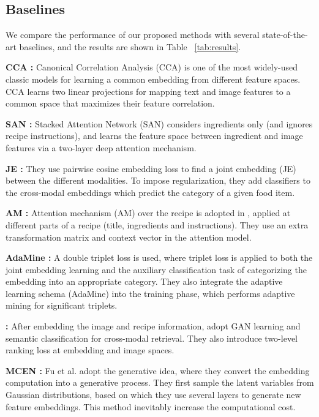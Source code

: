 \documentclass[journal]{IEEEtran}
\begin{document}
\subsection{Baselines}
We compare the performance of our proposed methods with several state-of-the-art baselines, and the results are shown in Table ~\ref{tab:results}.

\textbf{CCA \cite{hotelling1936relations}:} Canonical Correlation Analysis (CCA) is one of the most widely-used classic models for learning a common embedding from different feature spaces. CCA learns two linear projections for mapping text and image features to a common space that maximizes their feature correlation. 

\textbf{SAN \cite{chen2017cross}:} Stacked Attention Network (SAN) considers ingredients only (and ignores recipe instructions), and learns the feature space between ingredient and image features via a two-layer deep attention mechanism.

\textbf{JE \cite{salvador2017learning}:} They use pairwise cosine embedding loss to find a joint embedding (JE) between the different modalities. To impose regularization, they add classifiers to the cross-modal embeddings which predict the category of a given food item.

\textbf{AM \cite{chen2018deep}:} Attention mechanism (AM) over the recipe is adopted in \cite{chen2018deep}, applied at different parts of a recipe (title, ingredients and instructions). They use an extra transformation matrix and context vector in the attention model.

\textbf{AdaMine \cite{carvalho2018cross}:} A double triplet loss is used, where triplet loss is applied to both the joint embedding learning and the auxiliary classification task of categorizing the embedding into an appropriate category. They also integrate the adaptive learning schema (AdaMine) into the training phase, which performs adaptive mining for significant triplets.

\textbf{ \cite{zhu2019r2gan}:} After embedding the image and recipe information,  adopt GAN learning and semantic classification for cross-modal retrieval. They also introduce two-level ranking loss at embedding and image spaces.

\textbf{MCEN \cite{fu2020mcen}:} Fu et al. adopt the generative idea, where they convert the embedding computation into a generative process. They first sample the latent variables from Gaussian distributions, based on which they use several layers to generate new feature embeddings. This method inevitably increase the computational cost.
\end{document}
